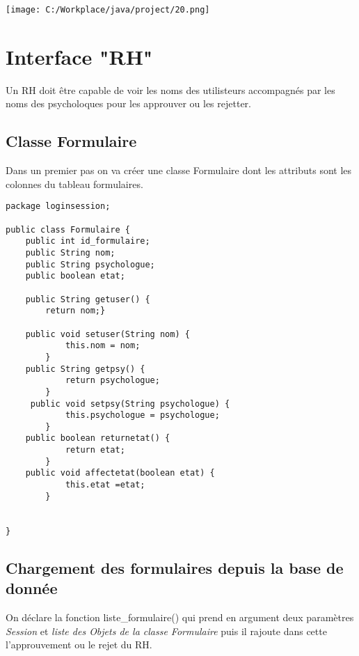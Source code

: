\documentclass[12]{article}
\begin{document}
\begin{center}
\texttt{[image: C:/Workplace/java/project/20.png]}
\end{center}




\section{Interface "RH"}

Un RH doit être capable de voir les noms des utilisteurs accompagnés par les noms des psycholoques
pour les approuver ou les rejetter. 
\subsection{Classe Formulaire}

Dans un premier pas on va créer une classe Formulaire dont les attributs sont les colonnes du tableau formulaires.

\lstset{language=java}
\begin{lstlisting}
package loginsession;

public class Formulaire {
	public int id_formulaire;
	public String nom;
	public String psychologue;
	public boolean etat;
	
	public String getuser() {
		return nom;}
		
	public void setuser(String nom) {
	        this.nom = nom;
	    }
	public String getpsy() {
	        return psychologue;
	    }
	 public void setpsy(String psychologue) {
	        this.psychologue = psychologue;
	    }
    public boolean returnetat() {
			return etat;
		}
    public void affectetat(boolean etat) {
			this.etat =etat;
		}
		

}
\end{lstlisting}
\subsection{Chargement des formulaires depuis la base de donnée}

On déclare la fonction liste\_formulaire() qui prend en argument deux paramètres \textit{Session} et \textit{liste des Objets de la classe Formulaire} puis il rajoute dans cette l'approuvement ou le rejet du RH.
\end{document}
